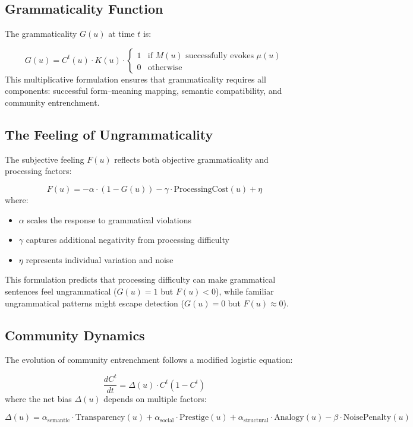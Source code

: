 \documentclass[12pt,letterpaper]{article}
\begin{document}
\subsection{Grammaticality Function}

The grammaticality $G(u)$ at time $t$ is:

\[
G(u) = C^t(u) \cdot K(u) \cdot \begin{cases}
1 & \text{if } M(u) \text{ successfully evokes } \mu(u) \\
0 & \text{otherwise}
\end{cases}
\]
This multiplicative formulation ensures that grammaticality requires all components: successful form--meaning mapping, semantic compatibility, and community entrenchment.

\subsection{The Feeling of Ungrammaticality}

The subjective feeling $F(u)$ reflects both objective grammaticality and processing factors:

\[
F(u) = -\alpha \cdot (1 - G(u)) - \gamma \cdot \text{ProcessingCost}(u) + \eta
\]
where:
\begin{itemize}
    \item $\alpha$ scales the response to grammatical violations
    \item $\gamma$ captures additional negativity from processing difficulty
    \item $\eta$ represents individual variation and noise
\end{itemize}
This formulation predicts that processing difficulty can make grammatical sentences feel ungrammatical ($G(u) = 1$ but $F(u) < 0$), while familiar ungrammatical patterns might escape detection ($G(u) = 0$ but $F(u) \approx 0$).



\subsection{Community Dynamics}

The evolution of community entrenchment follows a modified logistic equation:

\[
\frac{dC^t}{dt} = \Delta(u) \cdot C^t(1 - C^t)
\]
where the net bias $\Delta(u)$ depends on multiple factors:

\[
\Delta(u) = \alpha_{\text{semantic}} \cdot \text{Transparency}(u) + \alpha_{\text{social}} \cdot \text{Prestige}(u) + \alpha_{\text{structural}} \cdot \text{Analogy}(u) - \beta \cdot \text{NoisePenalty}(u)
\]
\end{document}
